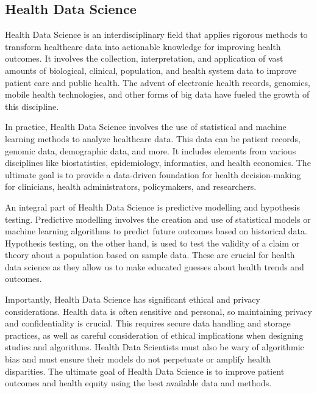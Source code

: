 \subsection{Health Data Science}

Health Data Science is an interdisciplinary field that applies rigorous methods to transform healthcare data into actionable knowledge for improving health outcomes. It involves the collection, interpretation, and application of vast amounts of biological, clinical, population, and health system data to improve patient care and public health. The advent of electronic health records, genomics, mobile health technologies, and other forms of big data have fueled the growth of this discipline.

In practice, Health Data Science involves the use of statistical and machine learning methods to analyze healthcare data. This data can be patient records, genomic data, demographic data, and more. It includes elements from various disciplines like biostatistics, epidemiology, informatics, and health economics. The ultimate goal is to provide a data-driven foundation for health decision-making for clinicians, health administrators, policymakers, and researchers.

An integral part of Health Data Science is predictive modelling and hypothesis testing. Predictive modelling involves the creation and use of statistical models or machine learning algorithms to predict future outcomes based on historical data. Hypothesis testing, on the other hand, is used to test the validity of a claim or theory about a population based on sample data. These are crucial for health data science as they allow us to make educated guesses about health trends and outcomes.

Importantly, Health Data Science has significant ethical and privacy considerations. Health data is often sensitive and personal, so maintaining privacy and confidentiality is crucial. This requires secure data handling and storage practices, as well as careful consideration of ethical implications when designing studies and algorithms. Health Data Scientists must also be wary of algorithmic bias and must ensure their models do not perpetuate or amplify health disparities. The ultimate goal of Health Data Science is to improve patient outcomes and health equity using the best available data and methods.


